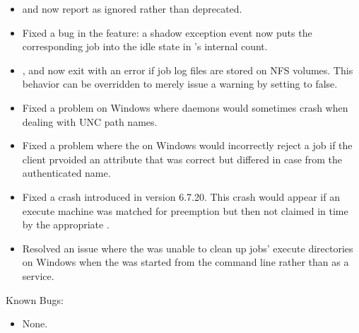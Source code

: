 \begin{itemize}
\item {} and  now report
 as ignored rather than deprecated.

\item Fixed a bug in the   feature:
a shadow exception event now puts the corresponding job into the
idle state in 's internal count.

\item {},  and  now exit
with an error if job log files are stored on NFS volumes. This
behavior can be overridden to merely issue a warning by setting
 to false.

\item Fixed a problem on Windows where daemons would sometimes crash
when dealing with UNC path names.

\item Fixed a problem where the  on Windows would
incorrectly reject a job if the client prvoided an 
attribute that was correct but differed in case from the authenticated
name.

\item Fixed a  crash introduced in version 6.7.20. This
crash would appear if an execute machine was matched for preemption
but then not claimed in time by the appropriate .

\item Resolved an issue where the  was unable to clean
up jobs' execute directories on Windows when the  was
started from the command line rather than as a service.

\end{itemize}

\noindent Known Bugs:

\begin{itemize}

\item None.

\end{itemize}

